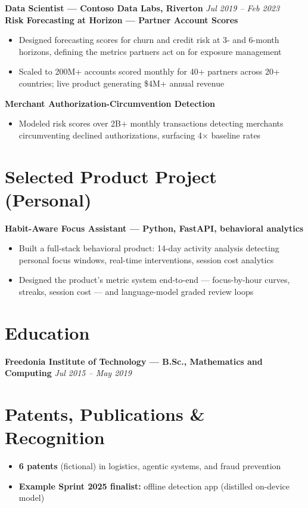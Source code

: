\documentclass[10pt]{article}
\newcommand{\entry}[2]{\textbf{#1} \hfill \textit{#2}\\[-0.35em]}
\newcommand{\proj}[1]{\vspace{0.5pt}\textbf{#1}\\[-0.4em]}
\begin{document}
\entry{Data Scientist — Contoso Data Labs, Riverton}{Jul 2019 -- Feb 2023}
\proj{Risk Forecasting at Horizon — Partner Account Scores}
\begin{itemize}
\item Designed forecasting scores for churn and credit risk at 3- and 6-month horizons, defining the metrics partners act on for exposure management
\item Scaled to 200M+ accounts scored monthly for 40+ partners across 20+ countries; live product generating \$4M+ annual revenue
\end{itemize}

\proj{Merchant Authorization-Circumvention Detection}
\begin{itemize}
\item Modeled risk scores over 2B+ monthly transactions detecting merchants circumventing declined authorizations, surfacing 4$\times$ baseline rates
\end{itemize}

\section{Selected Product Project (Personal)}
\proj{Habit-Aware Focus Assistant — Python, FastAPI, behavioral analytics}
\begin{itemize}
\item Built a full-stack behavioral product: 14-day activity analysis detecting personal focus windows, real-time interventions, session cost analytics
\item Designed the product's metric system end-to-end — focus-by-hour curves, streaks, session cost — and language-model graded review loops
\end{itemize}

\section{Education}
\entry{Freedonia Institute of Technology — B.Sc., Mathematics and Computing}{Jul 2015 -- May 2019}

\section{Patents, Publications \& Recognition}
\begin{itemize}
\item \textbf{6 patents} (fictional) in logistics, agentic systems, and fraud prevention
\item \textbf{Example Sprint 2025 finalist:} offline detection app (distilled on-device model)
\end{itemize}
\end{document}
